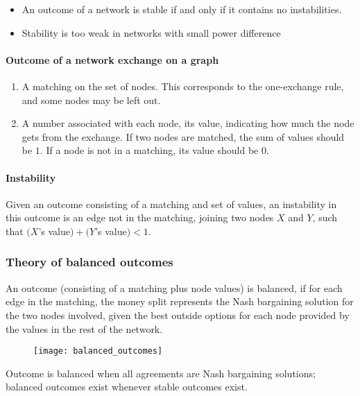 \begin{itemize}
\item An outcome of a network is stable if and only if it contains no instabilities.
\item Stability is too weak in networks with small power difference
\end{itemize}

\paragraph{Outcome of a network exchange on a graph}

\begin{enumerate}
\item A matching on the set of nodes. This corresponds to the one-exchange rule, and some nodes may be left out.
\item A number associated with each node, its value, indicating how much the node gets from the exchange. If two nodes are matched, the sum of values should be $1$. If a node is not in a matching, its value should be $0$.
\end{enumerate}

\paragraph{Instability}

Given an outcome consisting of a matching and set of values, an instability in this outcome is an edge not in the matching, joining two nodes $X$ and $Y$, such that $(X$’s value$) + (Y$’s value$) < 1$.

\subsubsection{Theory of balanced outcomes}

\begin{formal}
An outcome (consisting of a matching plus node values) is balanced, if for each edge in the matching, the money split represents the Nash bargaining solution for the two nodes involved, given the best outside options for each node provided by the values in the rest of the network.
\end{formal}

\begin{figure}[H]
    \centering
    \texttt{[image: balanced\_outcomes]}
\end{figure}

Outcome is balanced when all agreements are Nash bargaining solutions; balanced outcomes exist whenever stable outcomes exist.

